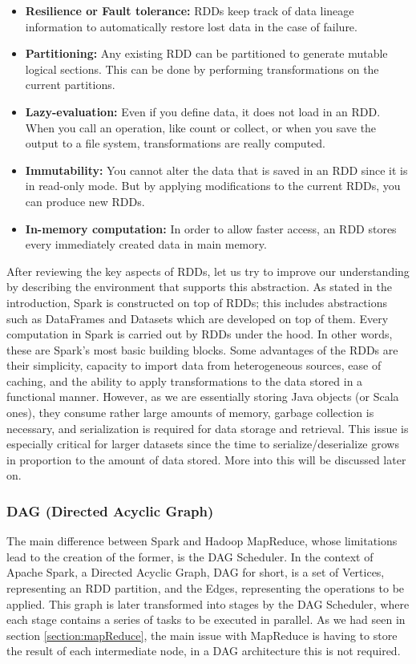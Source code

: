 \begin{itemize}
    \item \textbf{Resilience or Fault tolerance:} RDDs keep track of data lineage information to automatically restore lost data in the case of failure.
    \item \textbf{Partitioning:} Any existing RDD can be partitioned to generate mutable logical sections. This can be done by performing transformations on the current partitions.
    \item \textbf{Lazy-evaluation:} Even if you define data, it does not load in an RDD. When you call an operation, like count or collect, or when you save the output to a file system, transformations are really computed.
    \item \textbf{Immutability:} You cannot alter the data that is saved in an RDD since it is in read-only mode. But by applying modifications to the current RDDs, you can produce new RDDs.
    \item \textbf{In-memory computation:} In order to allow faster access, an RDD stores every immediately created data in main memory.
\end{itemize}

After reviewing the key aspects of RDDs, let us try to improve our understanding by describing the environment that supports this abstraction. As stated in the introduction, Spark is constructed on top of RDDs; this includes abstractions such as DataFrames and Datasets which are developed on top of them.  Every computation in Spark is carried out by RDDs under the hood. In other words, these are Spark's most basic building blocks. Some advantages of the RDDs are their simplicity, capacity to import data from heterogeneous sources, ease of caching, and the ability to apply transformations to the data stored in a functional manner. However, as we are essentially storing Java objects (or Scala ones), they consume rather large amounts of memory, garbage collection is necessary, and serialization is required for data storage and retrieval. This issue is especially critical for larger datasets since the time to serialize/deserialize grows in proportion to the amount of data stored. More into this will be discussed later on.

\subsubsection{DAG (Directed Acyclic Graph)}

The main difference between Spark and Hadoop MapReduce, whose limitations lead to the creation of the former, is the DAG Scheduler. In the context of Apache Spark, a Directed Acyclic Graph, DAG for short, is a set of Vertices, representing an RDD partition, and the Edges, representing the operations to be applied. This graph is later transformed into stages by the DAG Scheduler, where each stage contains a series of tasks to be executed in parallel. As we had seen in section \ref{section:mapReduce}, the main issue with MapReduce is having to store the result of each intermediate node, in a DAG architecture this is not required.

